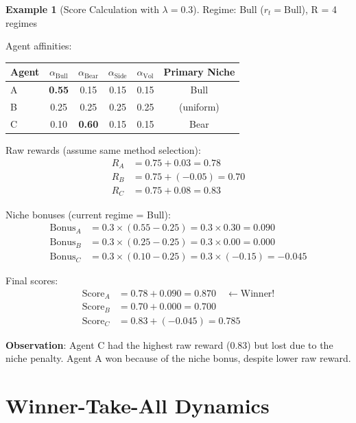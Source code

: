 \documentclass[11pt,a4paper]{article}
\theoremstyle{definition}
\newtheorem{example}{Example}[section]
\theoremstyle{plain}
\begin{document}
\begin{example}[Score Calculation with $\lambda = 0.3$]
Regime: Bull ($r_t = \text{Bull}$), R = 4 regimes

Agent affinities:
\begin{center}
\begin{tabular}{lcccc|c}
\toprule
Agent & $\alpha_{\text{Bull}}$ & $\alpha_{\text{Bear}}$ & $\alpha_{\text{Side}}$ & $\alpha_{\text{Vol}}$ & Primary Niche \\
\midrule
A & \textbf{0.55} & 0.15 & 0.15 & 0.15 & Bull \\
B & 0.25 & 0.25 & 0.25 & 0.25 & (uniform) \\
C & 0.10 & \textbf{0.60} & 0.15 & 0.15 & Bear \\
\bottomrule
\end{tabular}
\end{center}

Raw rewards (assume same method selection):
\begin{align}
R_A &= 0.75 + 0.03 = 0.78 \\
R_B &= 0.75 + (-0.05) = 0.70 \\
R_C &= 0.75 + 0.08 = 0.83
\end{align}

Niche bonuses (current regime = Bull):
\begin{align}
\text{Bonus}_A &= 0.3 \times (0.55 - 0.25) = 0.3 \times 0.30 = 0.090 \\
\text{Bonus}_B &= 0.3 \times (0.25 - 0.25) = 0.3 \times 0.00 = 0.000 \\
\text{Bonus}_C &= 0.3 \times (0.10 - 0.25) = 0.3 \times (-0.15) = -0.045
\end{align}

Final scores:
\begin{align}
\text{Score}_A &= 0.78 + 0.090 = 0.870 \quad \leftarrow \text{Winner!} \\
\text{Score}_B &= 0.70 + 0.000 = 0.700 \\
\text{Score}_C &= 0.83 + (-0.045) = 0.785
\end{align}

\textbf{Observation}: Agent C had the highest raw reward (0.83) but lost due to the niche penalty. Agent A won because of the niche bonus, despite lower raw reward.
\end{example}

\section{Winner-Take-All Dynamics}
\end{document}

